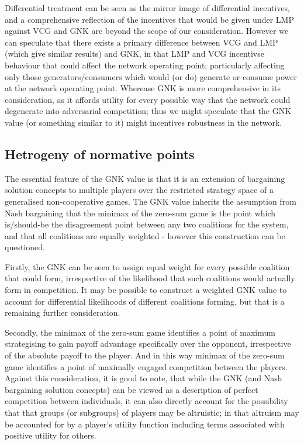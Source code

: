 Differential treatment can be seen as the mirror image of differential incentives, and a comprehensive reflection of the incentives that would be given under LMP against VCG and GNK are beyond the scope of our consideration.
However we can speculate that there exists a primary difference between VCG and LMP (which give similar results) and GNK, in that LMP and VCG incentivse behaviour that could affect the network operating point; particularly affecting only those generators/consumers which would (or do) generate or consume power at the network operating point.
Wherease GNK is more comprehensive in its consideration, as it affords utility for every possible way that the network could degenerate into adversarial competition; thus we might speculate that the GNK value (or something similar to it) might incentives robustness in the network.

\subsection{Hetrogeny of normative points}

The essential feature of the GNK value is that it is an extension of bargaining solution concepts to multiple players over the restricted strategy space of a generalised non-cooperative games.
The GNK value inherits the assumption from Nash bargaining that the minimax of the zero-sum game is the point which is/should-be the disagreement point between any two coalitions for the system, and that all coalitions are equally weighted - however this construction can be questioned.

Firstly, the GNK can be seen to assign equal weight for every possible coalition that could form, irrespective of the likelihood that such coalitions would actually form in competition.
It may be possible to construct a weighted GNK value to account for differential likelihoods of different coalitions forming, but that is a remaining further consideration.

Secondly, the minimax of the zero-sum game identifies a point of maximum strategising to gain payoff advantage specifically over the opponent, irrespective of the absolute payoff to the player.
And in this way minimax of the zero-sum game identifies a point of maximally engaged competition between the players.
Against this consideration, it is good to note, that while the GNK (and Nash bargaining solution concepts) can be viewed as a description of perfect competition between individuals, it can also directly account for the possibility that that groups (or subgroups) of players may be altruistic; in that altruism may be accounted for by a player's utility function including terms associated with positive utility for others.

